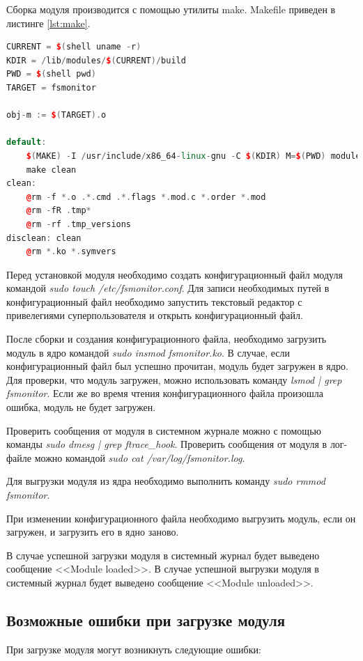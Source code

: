 \documentclass[a4paper,14pt]{article}
\begin{document}
Сборка модуля производится с помощью утилиты make. Makefile приведен в листинге \ref{lst:make}.

\begin{lstlisting}[language=C++,label={lst:make}, caption=\text{Makefile.}]
CURRENT = $(shell uname -r)
KDIR = /lib/modules/$(CURRENT)/build
PWD = $(shell pwd)
TARGET = fsmonitor
	
obj-m := $(TARGET).o 
	
default:
	$(MAKE) -I /usr/include/x86_64-linux-gnu -C $(KDIR) M=$(PWD) modules
	make clean
clean:
	@rm -f *.o .*.cmd .*.flags *.mod.c *.order *.mod
	@rm -fR .tmp*
	@rm -rf .tmp_versions
disclean: clean
	@rm *.ko *.symvers
\end{lstlisting}

Перед установкой модуля необходимо создать конфигурационный файл модуля командой \textit{sudo touch /etc/fsmonitor.conf}. Для записи необходимых путей в конфигурационный файл необходимо запустить текстовый редактор с привелегиями суперпользователя и открыть конфигурационный файл. 

После сборки и создания конфигурационного файла, необходимо загрузить модуль в ядро командой \textit{sudo insmod fsmonitor.ko}. В случае, если конфигурационный файл был успешно прочитан, модуль будет загружен в ядро. Для проверки, что модуль загружен, можно использовать команду \textit{lsmod | grep fsmonitor}. Если же во время чтения конфигурационного файла произошла ошибка, модуль не будет загружен.

Проверить сообщения от модуля в системном журнале можно с помощью команды \textit{sudo dmesg | grep ftrace\_hook}. Проверить сообщения от модуля в лог-файле можно командой \textit{sudo cat /var/log/fsmonitor.log}.

Для выгрузки модуля из ядра необходимо выполнить команду \textit{sudo rmmod fsmonitor}.

При изменении конфигурационного файла необходимо выгрузить модуль, если он загружен, и загрузить его в ядно заново.

В случае успешной загрузки модуля в системный журнал будет выведено сообщение <<Module loaded>>. В случае успешной выгрузки модуля в системный журнал будет выведено сообщение <<Module unloaded>>.

\subsection{Возможные ошибки при загрузке модуля}

При загрузке модуля могут возникнуть следующие ошибки:
\end{document}
